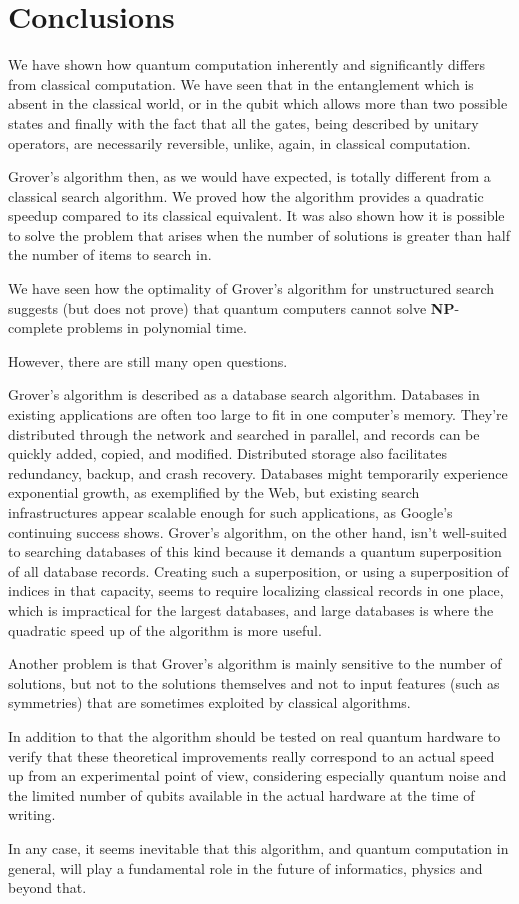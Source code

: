 \chapter{Conclusions}
We have shown how quantum computation inherently and significantly differs from classical computation.
We have seen that in the entanglement which is absent in the classical world, or in the qubit which allows more than two possible states and finally with the fact that all the gates, being described by unitary operators, are necessarily reversible, unlike, again, in classical computation.

\bigskip
Grover's algorithm then, as we would have expected, is totally different from a classical search algorithm. We proved how the algorithm provides a quadratic speedup compared to its classical equivalent. It was also shown how it is possible to solve the problem that arises when the number of solutions is greater than half the number of items to search in.

We have seen how the optimality of Grover's algorithm for unstructured search suggests (but does not prove) that quantum computers cannot solve \textbf{NP}-complete problems in polynomial time.

\bigskip
However, there are still many open questions.

Grover's algorithm is described as a database search algorithm. Databases in existing applications are often
too large to fit in one computer’s memory. They’re
distributed through the network and searched in parallel, and records can be quickly added, copied, and
modified. Distributed storage also facilitates redundancy, backup, and crash recovery.  Databases
might temporarily experience exponential growth, as
exemplified by the Web, but existing search infrastructures appear scalable enough for such applications, as Google’s continuing success shows. Grover’s
algorithm, on the other hand, isn’t well-suited to
searching databases of this kind because it demands a quantum superposition of all database
records. Creating such a superposition, or using a superposition of indices in that capacity, seems to require localizing classical records in one place, which
is impractical for the largest databases, and large databases is where the quadratic speed up of the algorithm is more useful.

\bigskip
Another problem is that Grover’s algorithm is mainly sensitive to the number of solutions, but not to the solutions themselves and not to input
features (such as symmetries) that are sometimes exploited
by classical algorithms.

\bigskip
In addition to that the algorithm should be tested on real quantum hardware to verify that these theoretical improvements really correspond to an actual speed up from an experimental point of view, considering especially quantum noise and the limited number of qubits available in the actual hardware at the time of writing.

\bigskip
In any case, it seems inevitable that this algorithm, and quantum computation in general, will play a fundamental role in the future of informatics, physics and beyond that.
